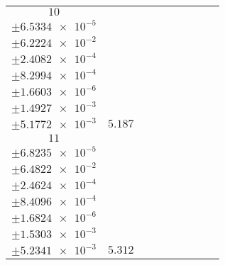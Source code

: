 \documentclass[8pt]{article}
\begin{document}
\begin{longtable}[l]{c c c c c c c c c}
$\num{10}$ & \begin{tabular}[c]{@{}c@{}}$\num{6.0869e-2}$ \\ $\pm\num{6.5334e-5}$\end{tabular} & \begin{tabular}[c]{@{}c@{}}$\num{-3.3723e-2}$ \\ $\pm\num{6.2224e-2}$\end{tabular} & \begin{tabular}[c]{@{}c@{}}$\num{-3.3751}$ \\ $\pm\num{2.4082e-4}$\end{tabular} & \begin{tabular}[c]{@{}c@{}}$\num{1.9775e+3}$ \\ $\pm\num{8.2994e-4}$\end{tabular} & \begin{tabular}[c]{@{}c@{}}$\num{3.9562}$ \\ $\pm\num{1.6603e-6}$\end{tabular} & \begin{tabular}[c]{@{}c@{}}$\num{1.1616}$ \\ $\pm\num{1.4927e-3}$\end{tabular} & \begin{tabular}[c]{@{}c@{}}$\num{4.2316}$ \\ $\pm\num{5.1772e-3}$\end{tabular} & $\num{5.187}$\\
$\num{11}$ & \begin{tabular}[c]{@{}c@{}}$\num{6.0867e-2}$ \\ $\pm\num{6.8235e-5}$\end{tabular} & \begin{tabular}[c]{@{}c@{}}$\num{-0.12115}$ \\ $\pm\num{6.4822e-2}$\end{tabular} & \begin{tabular}[c]{@{}c@{}}$\num{-0.95458}$ \\ $\pm\num{2.4624e-4}$\end{tabular} & \begin{tabular}[c]{@{}c@{}}$\num{1.98e+3}$ \\ $\pm\num{8.4096e-4}$\end{tabular} & \begin{tabular}[c]{@{}c@{}}$\num{3.961}$ \\ $\pm\num{1.6824e-6}$\end{tabular} & \begin{tabular}[c]{@{}c@{}}$\num{1.1666}$ \\ $\pm\num{1.5303e-3}$\end{tabular} & \begin{tabular}[c]{@{}c@{}}$\num{4.2341}$ \\ $\pm\num{5.2341e-3}$\end{tabular} & $\num{5.312}$\\

\end{longtable}
\end{document}
